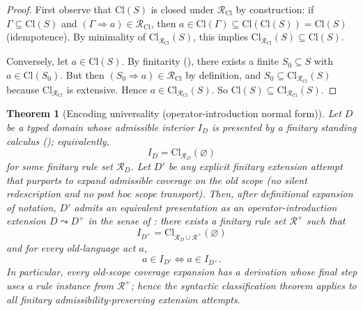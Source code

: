 \documentclass[11pt]{article}
\newtheorem{theorem}{Theorem}[section]
\theoremstyle{definition}
\begin{document}
\begin{proof}
First observe that $\mathrm{Cl}(S)$ is closed under $\mathcal{R}_{\mathrm{Cl}}$ by construction: if $\Gamma\subseteq \mathrm{Cl}(S)$ and $(\Gamma\Rightarrow a)\in\mathcal{R}_{\mathrm{Cl}}$, then $a\in \mathrm{Cl}(\Gamma)\subseteq \mathrm{Cl}(\mathrm{Cl}(S))=\mathrm{Cl}(S)$ (idempotence).
By minimality of $\mathrm{Cl}_{\mathcal{R}_{\mathrm{Cl}}}(S)$, this implies $\mathrm{Cl}_{\mathcal{R}_{\mathrm{Cl}}}(S)\subseteq \mathrm{Cl}(S)$.

Conversely, let $a\in \mathrm{Cl}(S)$.
By finitarity (), there exists a finite $S_0\subseteq S$ with $a\in \mathrm{Cl}(S_0)$.
But then $(S_0\Rightarrow a)\in \mathcal{R}_{\mathrm{Cl}}$ by definition, and $S_0\subseteq \mathrm{Cl}_{\mathcal{R}_{\mathrm{Cl}}}(S)$ because $\mathrm{Cl}_{\mathcal{R}_{\mathrm{Cl}}}$ is extensive.
Hence $a\in \mathrm{Cl}_{\mathcal{R}_{\mathrm{Cl}}}(S)$.
So $\mathrm{Cl}(S)\subseteq \mathrm{Cl}_{\mathcal{R}_{\mathrm{Cl}}}(S)$.
\end{proof}

\begin{theorem}[Encoding universality (operator-introduction normal form)]
\label{thm:encoding-universality}
Let $D$ be a typed domain whose admissible interior $I_D$ is presented by a \emph{finitary} standing calculus (); equivalently,
\[
I_D=\mathrm{Cl}_{\mathcal{R}_D}(\varnothing)
\]
for some finitary rule set $\mathcal{R}_D$.
Let $D'$ be any \emph{explicit} finitary extension attempt that purports to expand admissible coverage on the \emph{old scope} (no silent redescription and no post hoc scope transport).
Then, after definitional expansion of notation, $D'$ admits an equivalent presentation as an operator-introduction extension $D\leadsto D^+$ in the sense of :
there exists a finitary rule set $\mathcal{R}^+$ such that
\[
I_{D^+}=\mathrm{Cl}_{\mathcal{R}_D\cup \mathcal{R}^+}(\varnothing)
\]
and for every old-language act $a$,
\[
a\in I_{D'}\iff a\in I_{D^+}.
\]
In particular, every old-scope coverage expansion has a derivation whose final step uses a rule instance from $\mathcal{R}^+$; hence the syntactic classification theorem  applies to \emph{all} finitary admissibility-preserving extension attempts.
\end{theorem}
\end{document}

